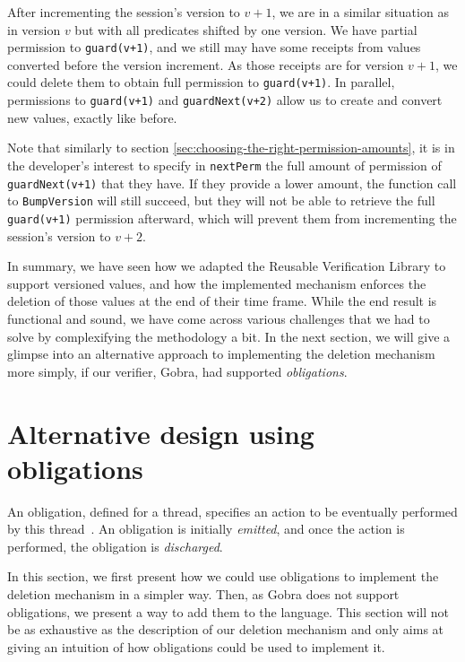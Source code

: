 After incrementing the session's version to $v+1$, we are in a similar situation as in version $v$ but with all predicates shifted by one version.
We have partial permission to \texttt{guard(v+1)}, and we still may have some receipts from values converted before the version increment.
As those receipts are for version $v+1$, we could delete them to obtain full permission to \texttt{guard(v+1)}.
In parallel, permissions to \texttt{guard(v+1)} and \texttt{guardNext(v+2)} allow us to create and convert new values, exactly like before.

Note that similarly to section \ref{sec:choosing-the-right-permission-amounts}, it is in the developer's interest to specify in \texttt{nextPerm} the full amount of permission of \texttt{guardNext(v+1)} that they have. If they provide a lower amount, the function call to \texttt{BumpVersion} will still succeed, but they will not be able to retrieve the full \texttt{guard(v+1)} permission afterward, which will prevent them from incrementing the session's version to $v+2$.


In summary, we have seen how we adapted the Reusable Verification Library to support versioned values, and how the implemented mechanism enforces the deletion of those values at the end of their time frame.
While the end result is functional and sound, we have come across various challenges that we had to solve by complexifying the methodology a bit.
In the next section, we will give a glimpse into an alternative approach to implementing the deletion mechanism more simply, if our verifier, Gobra, had supported \emph{obligations}.

\section{Alternative design using obligations}
\label{sec:alternative-design-using-obligations}

An obligation, defined for a thread, specifies an action to be eventually performed by this thread~\cite{}. An obligation is initially \emph{emitted}, and once the action is performed, the obligation is \emph{discharged}.

In this section, we first present how we could use obligations to implement the deletion mechanism in a simpler way.
Then, as Gobra does not support obligations, we present a way to add them to the language.
This section will not be as exhaustive as the description of our deletion mechanism and only aims at giving an intuition of how obligations could be used to implement it.

